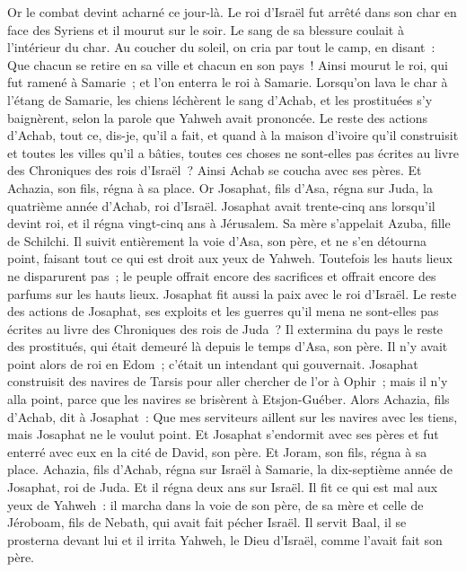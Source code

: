 \begin{multicols}{2}
Or le combat devint acharné ce jour-là. Le roi d'Israël fut arrêté dans son char en face des Syriens et il mourut sur le soir. Le sang de sa blessure coulait à l'intérieur du char.
Au coucher du soleil, on cria par tout le camp, en disant~: Que chacun se retire en sa ville et chacun en son pays~!
Ainsi mourut le roi, qui fut ramené à Samarie~; et l'on enterra le roi à Samarie.
Lorsqu'on lava le char à l'étang de Samarie, les chiens léchèrent le sang d'Achab, et les prostituées s'y baignèrent, selon la parole que Yahweh avait prononcée.
Le reste des actions d'Achab, tout ce, dis-je, qu'il a fait, et quand à la maison d'ivoire qu'il construisit et toutes les villes qu'il a bâties, toutes ces choses ne sont-elles pas écrites au livre des Chroniques des rois d'Israël~?
Ainsi Achab se coucha avec ses pères. Et Achazia, son fils, régna à sa place.
Or Josaphat, fils d'Asa, régna sur Juda, la quatrième année d'Achab, roi d'Israël.
Josaphat avait trente-cinq ans lorsqu'il devint roi, et il régna vingt-cinq ans à Jérusalem. Sa mère s'appelait Azuba, fille de Schilchi.
Il suivit entièrement la voie d'Asa, son père, et ne s'en détourna point, faisant tout ce qui est droit aux yeux de Yahweh.
Toutefois les hauts lieux ne disparurent pas~; le peuple offrait encore des sacrifices et offrait encore des parfums sur les hauts lieux.
Josaphat fit aussi la paix avec le roi d'Israël.
Le reste des actions de Josaphat, ses exploits et les guerres qu'il mena ne sont-elles pas écrites au livre des Chroniques des rois de Juda~?
Il extermina du pays le reste des prostitués, qui était demeuré là depuis le temps d'Asa, son père.
Il n'y avait point alors de roi en Edom~; c'était un intendant qui gouvernait.
Josaphat construisit des navires de Tarsis pour aller chercher de l'or à Ophir~; mais il n'y alla point, parce que les navires se brisèrent à Etsjon-Guéber.
Alors Achazia, fils d'Achab, dit à Josaphat~: Que mes serviteurs aillent sur les navires avec les tiens, mais Josaphat ne le voulut point.
Et Josaphat s'endormit avec ses pères et fut enterré avec eux en la cité de David, son père. Et Joram, son fils, régna à sa place.
Achazia, fils d'Achab, régna sur Israël à Samarie, la dix-septième année de Josaphat, roi de Juda. Et il régna deux ans sur Israël.
Il fit ce qui est mal aux yeux de Yahweh~: il marcha dans la voie de son père, de sa mère et celle de Jéroboam, fils de Nebath, qui avait fait pécher Israël.
Il servit Baal, il se prosterna devant lui et il irrita Yahweh, le Dieu d'Israël, comme l'avait fait son père.
\PPE{}
\end{multicols}
